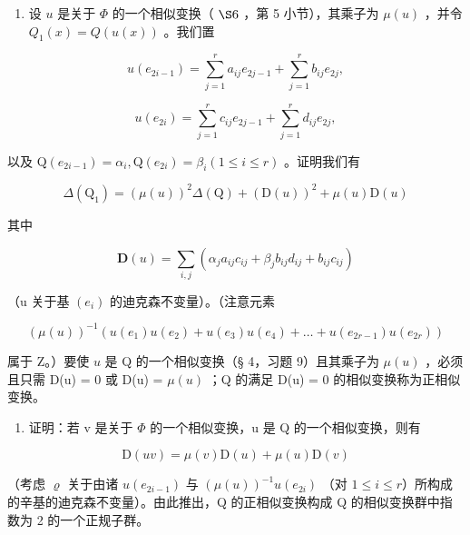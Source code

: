 \begin{enumerate}
\def\labelenumi{\alph{enumi})}
\setcounter{enumi}{1}
\tightlist
\item
  设 \(u\) 是关于 \(\Phi\) 的一个相似变换（ \(\S 6\) ，第 5 小节），其乘子为 \(\mu(u)\) ，并令 \(Q_{1}(x) = Q(u(x))\) 。我们置
\end{enumerate}

\[
u (e _ {2 i - 1}) = \sum_ {j = 1} ^ {r} a _ {i j} e _ {2 j - 1} + \sum_ {j = 1} ^ {r} b _ {i j} e _ {2 j},
\]

\[
u (e _ {2 i}) = \sum_ {j = 1} ^ {r} c _ {i j} e _ {2 j - 1} + \sum_ {j = 1} ^ {r} d _ {i j} e _ {2 j},
\]

以及 \(\mathrm{Q}(e_{2i - 1}) = \alpha_i, \mathrm{Q}(e_{2i}) = \beta_i (1 \leqslant i \leqslant r)\) 。证明我们有

\[
\Delta (\mathrm{Q} _ {1}) = (\mu (u)) ^ {2} \Delta (\mathrm{Q}) + (\mathrm{D} (u)) ^ {2} + \mu (u) \mathrm{D} (u)
\]

其中

\[
\mathbf {D} (u) = \sum_ {i, j} (\alpha_ {j} a _ {i j} c _ {i j} + \beta_ {j} b _ {i j} d _ {i j} + b _ {i j} c _ {i j})
\]

（u 关于基 \((e_{i})\) 的迪克森不变量）。（注意元素

\[
(\mu (u)) ^ {- 1} (u (e _ {1}) u (e _ {2}) + u (e _ {3}) u (e _ {4}) + \dots + u (e _ {2 r - 1}) u (e _ {2 r}))
\]

属于 Z。）要使 \(u\) 是 Q 的一个相似变换（§ 4，习题 9）且其乘子为 \(\mu(u)\) ，必须且只需 D(u) = 0 或 D(u) = \(\mu(u)\) ；Q 的满足 D(u) = 0 的相似变换称为正相似变换。

\begin{enumerate}
\def\labelenumi{\alph{enumi})}
\setcounter{enumi}{2}
\tightlist
\item
  证明：若 v 是关于 \(\Phi\) 的一个相似变换，u 是 Q 的一个相似变换，则有
\end{enumerate}

\[
\mathrm{D} (u v) = \mu (v) \mathrm{D} (u) + \mu (u) \mathrm{D} (v)
\]

（考虑 \(\varrho\) 关于由诸 \(u(e_{2i-1})\) 与 \((\mu(u))^{-1}u(e_{2i})\) （对 \(1 \leqslant i \leqslant r\)）所构成的辛基的迪克森不变量）。由此推出，Q 的正相似变换构成 Q 的相似变换群中指数为 2 的一个正规子群。

